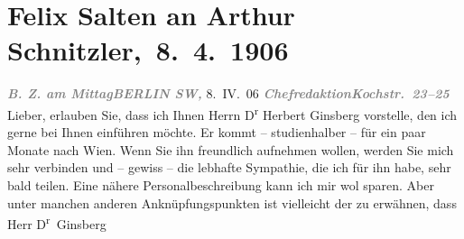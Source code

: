 

         
         \renewcommand{\erwaehntePersonen}{Personen: Herbert Ginsberg, Felix Salten, Ottilie Salten, Olga Schnitzler}
         \renewcommand{\erwaehnteInstitutionen}{Institutionen: B.Z. am Mittag}
         \renewcommand{\erwaehnteOrte}{Orte: Berlin, Griechenland, Kairo, Kochstraße, Wien}
         \renewcommand{\erwaehnteWerke}{Werke: Reisen der Jahre 1893–1909}
               \section[ Felix Salten an Arthur Schnitzler, 8. 4. 1906]{ Felix Salten an Arthur Schnitzler, 8. 4. 1906}\nopagebreak{}\rehead{ }\begin{ledgroupsized}[t]{13cm}\normalsize\beginnumbering \toendnotes[C]{\smallbreak\pagebreak[2]} 
\toendnotes[C]{\smallbreak}\pstart
           \noindent{}{\pb}\textcolor{gray}{\textbf{\emph{B. Z. am Mittag}}}\hfill \textcolor{gray}{\textbf{\emph{BERLIN SW,}}}{ }8. IV. 06\pend
           \pstart
           \textcolor{gray}{\textbf{\emph{Chefredaktion}}}\hfill \textcolor{gray}{\textbf{\emph{Kochstr. 23–25}}}\pend
           \pstart
           Lieber, erlauben Sie, dass ich Ihnen Herrn D\textsuperscript{r}{ }Herbert Ginsberg vorstelle, den ich gerne bei
               Ihnen einführen möchte. Er kommt – studienhalber – für ein paar Monate nach Wien. Wenn Sie ihn freundlich aufnehmen wollen,
               werden Sie mich sehr verbinden und – gewiss – die lebhafte Sympathie, die ich für ihn
               habe, sehr bald teilen. Eine nähere Personalbeschreibung kann ich mir wol sparen.
               Aber unter manchen anderen Anknüpfungspunkten ist vielleicht der zu erwähnen, dass
               Herr D\textsuperscript{r} Ginsberg

\end{ledgroupsized}
